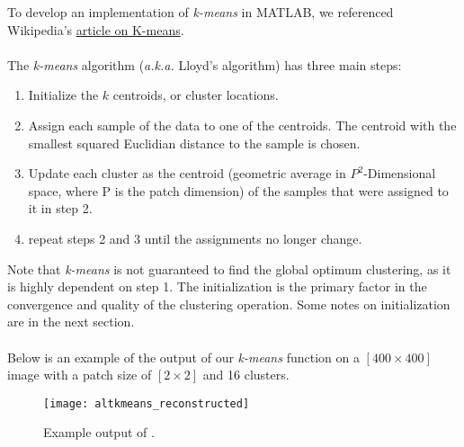 \documentclass[]{../ncmathy}
\begin{document}
	
	To develop an implementation of \textit{k-means} in MATLAB, we referenced Wikipedia's \href{https://en.wikipedia.org/wiki/K-means_clustering#Standard_algorithm}{article on K-means}.
	\\\\
	The \textit{k-means} algorithm (\textit{a.k.a.} Lloyd's algorithm) has three main steps:
	
	\begin{enumerate}
	\item Initialize the $k$ centroids, or cluster locations.
	\item Assign each sample of the data to one of the centroids. The centroid with the smallest squared Euclidian distance to the sample is chosen. 
	\item Update each cluster as the centroid (geometric average in $P^2$-Dimensional space, where P is the patch dimension) of the samples that were assigned to it in step 2.
	\item repeat steps 2 and 3 until the assignments no longer change. 
	\end{enumerate}
	
	Note that \textit{k-means} is not guaranteed to find the global optimum clustering, as it is highly dependent on step 1. The initialization is the primary factor in the convergence and quality of the clustering operation. Some notes on initialization are in the next section.
	\\\\
	Below is an example of the output of our \textit{k-means} function on a $[400\times 400]$ image with a patch size of $[2\times 2]$ and 16 clusters. 
	
	\begin{figure}[H]
	\centering\texttt{[image: altkmeans\_reconstructed]}
	\caption{Example output of .}
	\end{figure}
	
\end{document}
